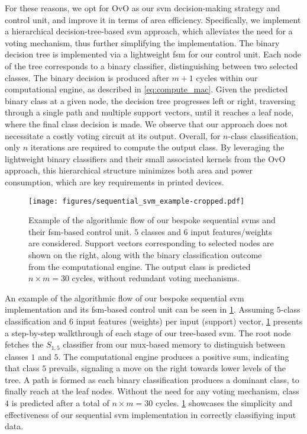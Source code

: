 For these reasons, we opt for OvO as our \gls{svm} decision-making strategy and control unit, and improve it in terms of area efficiency. 
Specifically, we implement a hierarchical decision-tree-based \gls{svm} approach, which alleviates the need for a voting mechanism, thus further simplifying the implementation.
The binary decision tree is implemented via a lightweight \gls{fsm} for our control unit.
Each node of the tree corresponds to a binary classifier, distinguishing between two selected classes.
The binary decision is produced after $m+1$ cycles within our computational engine, as described in \cref{eq:compute_mac}.
Given the predicted binary class at a given node, the decision tree progresses left or right, traversing through a single path and multiple support vectors, until it reaches a leaf node, where the final class decision is made.
We observe that our approach does not necessitate a costly voting circuit at its output.
Overall, for $n$-class classification, only $n$ iterations are required to compute the output class.
By leveraging the lightweight binary classifiers and their small associated kernels from the OvO approach, this hierarchical structure minimizes both area and power consumption, which are key requirements in printed devices.



\begin{figure}[!t]
    \centering
    \texttt{[image: figures/sequential\_svm\_example-cropped.pdf]}
    \caption{Example of the algorithmic flow of our bespoke sequential \glspl{svm} and their \gls{fsm}-based control unit. $5$ classes and $6$ input features/weights are considered. Support vectors corresponding to selected nodes are shown on the right, along with the binary classification outcome from the computational engine. The output class is predicted $n\times m=30$ cycles, without redundant voting mechanisms.
    }
    \label{fig:example}
\end{figure}
An example of the algorithmic flow of our bespoke sequential \gls{svm} implementation and its \gls{fsm}-based control unit can be seen in \cref{fig:example}.
Assuming $5$-class classification and $6$ input features (weights) per input (support) vector, \cref{fig:example} presents a step-by-step walkthrough of each stage of our tree-based \gls{svm}.
The root node fetches the $S_{1,5}$ classifier from our \gls{mux}-based memory to distinguish between classes $1$ and $5$.
The computational engine produces a positive sum, indicating that class $5$ prevails, signaling a move on the right towards lower levels of the tree.
A path is formed as each binary classification produces a dominant class, to finally reach at the leaf nodes.
Without the need for any voting mechanism, class $4$ is predicted after a total of $n\times m=30$ cycles.
\cref{fig:example} showcases the simplicity and effectiveness of our sequential \gls{svm} implementation in correctly classifiying input data.